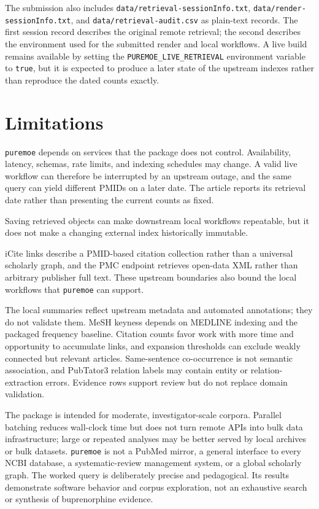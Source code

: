 The submission also includes \texttt{data/retrieval-sessionInfo.txt},
\texttt{data/render-sessionInfo.txt}, and \texttt{data/retrieval-audit.csv} as plain-text
records. The first session record describes the original remote retrieval;
the second describes the environment used for the submitted render and local
workflows. A live build remains
available by setting the \texttt{PUREMOE\_LIVE\_RETRIEVAL} environment variable to
\texttt{true}, but it is expected to
produce a later state of the upstream indexes rather than reproduce the dated
counts exactly.

\section{Limitations}\label{limitations}

\texttt{puremoe} depends on services that the package does not control. Availability,
latency, schemas, rate limits, and indexing schedules may change. A valid live
workflow can therefore be interrupted by an upstream outage, and the same query
can yield different PMIDs on a later date. The article reports its retrieval
date rather than presenting the current counts as fixed.

Saving retrieved objects can make downstream local workflows repeatable, but it
does not make a changing external index historically immutable.

iCite links describe a PMID-based citation collection rather than a universal
scholarly graph, and the PMC endpoint retrieves open-data XML rather than
arbitrary publisher full text. These upstream boundaries also bound the local
workflows that \texttt{puremoe} can support.

The local summaries reflect upstream metadata and automated annotations; they
do not validate them. MeSH keyness depends on MEDLINE indexing and the packaged
frequency baseline. Citation counts favor work with more time and opportunity
to accumulate links, and expansion thresholds can exclude weakly connected but
relevant articles. Same-sentence co-occurrence is not semantic association, and
PubTator3 relation labels may contain entity or relation-extraction errors.
Evidence rows support review but do not replace domain validation.

The package is intended for moderate, investigator-scale corpora. Parallel
batching reduces wall-clock time but does not turn remote APIs into bulk data
infrastructure; large or repeated analyses may be better served by local
archives or bulk datasets. \texttt{puremoe} is not a PubMed mirror, a general interface
to every NCBI database, a systematic-review management system, or a global
scholarly graph. The worked query is deliberately precise and pedagogical. Its
results demonstrate software behavior and corpus exploration, not an exhaustive
search or synthesis of buprenorphine evidence.

